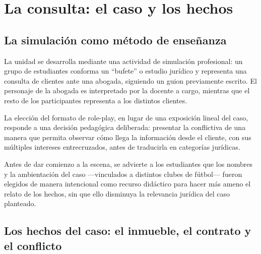 \documentclass[12pt,oneside]{book}
\begin{document}

\chapter{La consulta: el caso y los hechos}

\section{La simulación como método de enseñanza}

La unidad se desarrolla mediante una actividad de simulación profesional: un grupo de estudiantes conforma un ``bufete'' o estudio jurídico y representa una consulta de clientes ante una abogada, siguiendo un guion previamente escrito. El personaje de la abogada es interpretado por la docente a cargo, mientras que el resto de los participantes representa a los distintos clientes.

\begin{note}
La elección del formato de role-play, en lugar de una exposición lineal del caso, responde a una decisión pedagógica deliberada: presentar la conflictiva de una manera que permita observar cómo llega la información desde el cliente, con sus múltiples intereses entrecruzados, antes de traducirla en categorías jurídicas.
\end{note}

Antes de dar comienzo a la escena, se advierte a los estudiantes que los nombres y la ambientación del caso —vinculados a distintos clubes de fútbol— fueron elegidos de manera intencional como recurso didáctico para hacer más ameno el relato de los hechos, sin que ello disminuya la relevancia jurídica del caso planteado.

\section{Los hechos del caso: el inmueble, el contrato y el conflicto}
\end{document}
